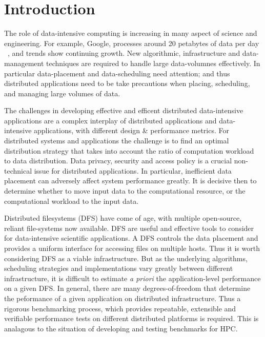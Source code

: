\documentclass{rspublic}
\newcommand{\micnote}[1]{ {\textcolor{blue} { ***Michael: #1 }}}
\newcommand{\betynote}[1]{ {\textcolor{orange} { ***Bety: #1 }}}
\newcommand{\jhanote}[1]{} \newcommand{\micnote}[1]{}\newcommand{\betynote}[1]{} \newcommand{\fixme}[1]{}
\begin{document}
\section{Introduction} The role of data-intensive computing is
increasing in many aspect of science and engineering. \jhanote{Please
  cite the ``Fourth Pardigm book by Tony Hey''} For example, Google,
processes around 20 petabytes of data per day ~\citep{google}, and
trends show continuing growth. New algorithmic, infrastructure and
data-management techniques are required to handle large data-volumnes
effectively.  In particular data-placement and data-scheduling need
attention; and thus distributed applications need to be take
precautions when placing, scheduling, and managing large volumes of
data.


The challenges in developing effective and efficent distributed
data-intensive applications are a complex interplay of distributed
applications and data-intensive applications, with different design \&
performance metrics.  For distributed systems and applications the
challenge is to find an optimal distribution strategy that takes into
account the ratio of computation workload to data distribution.  Data
privacy, security and access policy is a crucial non-technical issue
for distributed applications.  In particular, inefficient data
placement can adversely affect system performance greatly. It is
decisive then to determine whether to move input data to the
computational resource, or the computational workload to the input
data.

Distributed filesystems (DFS) have come of age, with multiple
open-source, reliant file-systems now available. DFS are useful and
effective tools to consider for data-intensive scientific
applications. A DFS controls the data placement and provides a uniform
interface for accessing files on multiple hosts. Thus it is worth
considering DFS as a viable infrastructure. But as the underlying
algorithms, scheduling strategies and implementations vary greatly
between different infrastructure, it is difficult to estimate {\it a
  priori} the application-level performance on a given DFS. In
general, there are many degrees-of-freedom that determine the
peformance of a given application on distributed infrastructure. Thus
a rigorous benchmarking process, which provides repeatable, extensible
and verifiable performance tests on different distributed platforms is
required.  This is analagous to the situation of developing and
testing benchmarks for HPC.
\end{document}
